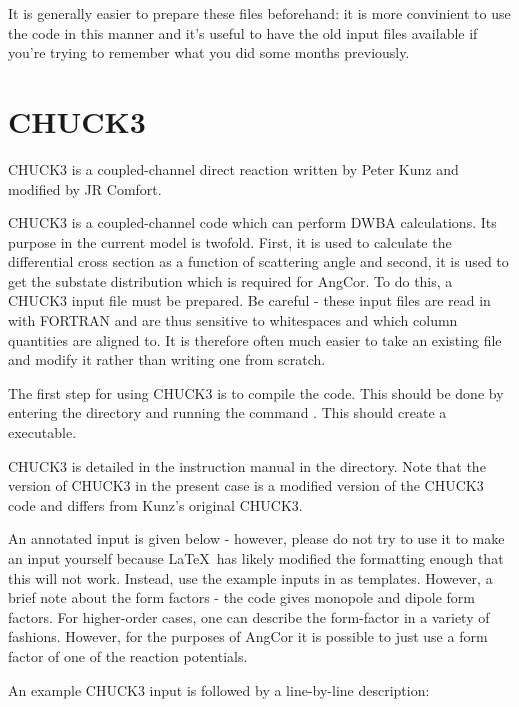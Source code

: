 \documentclass[a4paper,10pt]{article}
\begin{document}
It is generally easier to prepare these files beforehand: it is more convinient to use the code in this manner and it's useful to have the old input files available if you're trying to remember what you did some months previously.


\section{CHUCK3}

CHUCK3 is a coupled-channel direct reaction written by Peter Kunz and modified by JR Comfort.

CHUCK3 is a coupled-channel code which can perform DWBA calculations. Its purpose in the current model is twofold. First, it is used to calculate the differential cross section as a function of scattering angle and second, it is used to get the substate distribution which is required for AngCor. To do this, a CHUCK3 input file must be prepared. Be careful - these input files are read in with FORTRAN and are thus sensitive to whitespaces and which column quantities are aligned to. It is therefore often much easier to take an existing file and modify it rather than writing one from scratch.

The first step for using CHUCK3 is to compile the code. This should be done by entering the  directory and running the command . This should create a  executable.

CHUCK3 is detailed in the instruction manual in the  directory. Note that the version of CHUCK3 in the present case is a modified version of the CHUCK3 code and differs from Kunz's original CHUCK3.

An annotated input is given below - however, please do not try to use it to make an input yourself because \LaTeX\ has likely modified the formatting enough that this will not work. Instead, use the example inputs in  as templates. However, a brief note about the form factors - the code  gives monopole and dipole form factors. For higher-order cases, one can describe the form-factor in a variety of fashions. However, for the purposes of AngCor it is possible to just use a form factor of one of the reaction potentials.

An example CHUCK3 input is followed by a line-by-line description:
\end{document}
